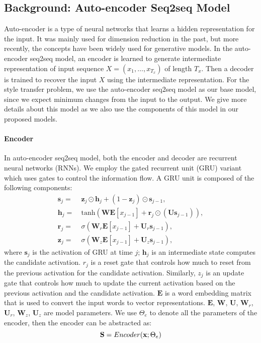 \documentclass[letterpaper]{article} \usepackage{aaai18}  \usepackage{times}  \usepackage{helvet}  \usepackage{courier}  \usepackage{url}  \usepackage{graphicx}  \usepackage{amsmath}
\newcommand{\vect}[1]{\mathbf{#1}}
\newcommand{\matr}[1]{\mathbf{#1}}
\newcommand{\vh}[0]{\vect{h}}
\newcommand{\vx}[0]{\vect{x}}
\newcommand{\vz}[0]{\vect{z}}
\newcommand{\vs}[0]{\vect{s}}
\newcommand{\vr}[0]{\vect{r}}
\newcommand{\mW}[0]{\matr{W}}
\newcommand{\mE}[0]{\matr{E}}
\newcommand{\mU}[0]{\matr{U}}
\newcommand{\mS}{\matr{S}}
\begin{document}
\subsection{Background: Auto-encoder Seq2seq Model}
Auto-encoder \cite{rumelhart1985learning} is a type of neural networks that 
learns a hidden representation for the input. It was mainly used for dimension reduction 
in the past, but more recently, the concepts have been widely used for generative models. 
In the auto-encoder seq2seq model, an encoder is learned to generate intermediate representation 
of input sequence $X=(x_1, \dots,x_{T_x})$ of length $T_x$. Then a decoder is trained to 
recover the input $X$ using the intermediate representation. 
For the style transfer problem, we use the auto-encoder seq2seq model as our base model, since we 
expect minimum changes from the input to the output. We give more details about this model 
as we also use the components of this model in our proposed models.


\paragraph{Encoder} In auto-encoder seq2seq model, both the encoder and decoder are recurrent neural networks (RNNs).
We employ the gated recurrent unit (GRU) variant which uses gates to control the information flow.
A GRU unit is composed of the following components:
{\small
\begin{align}
     \vs_j =& ~ \vz_j \odot \vh_j + (1-\vz_j) \odot \vs_{j-1}, \\
     \vh_j =& ~\text{tanh} \left(   \mW \mE[x_{j-1}] + \vr_j \odot (\mU\vs_{j-1})  \right), \\
	\vr_j =& ~ \sigma \left(  \mW_r \mE[x_{j-1}] + \mU_r \vs_{j-1}  \right), \\
	\vz_j =& ~ \sigma \left(  \mW_z \mE[x_{j-1}] + \mU_z \vs_{j-1}  \right), 
\end{align}
}where $\vs_j$ is the activation of GRU at time $j$; $\vh_j$ is an intermediate state computes the candidate activation. 
$r_j$ is a reset gate that controls how much to reset from the previous activation for the candidate activation. 
Similarly, $z_j$ is an update gate that controls how much to update the current activation based on the previous 
activation and the candidate activation. 
$\mE$ is a word embedding matrix that is used to convert the input words to vector representations.  
$\mE$, $\mW$, $\mU$, $\mW_r$, $\mU_r$, $\mW_z$, $\mU_z$ are model parameters. We use $\Theta_e$ to denote 
all the parameters of the encoder,  then the encoder can be abstracted as:
\begin{equation}
\small
\mS = Encoder(\vx; \Theta_e)
\end{equation}
\end{document}
